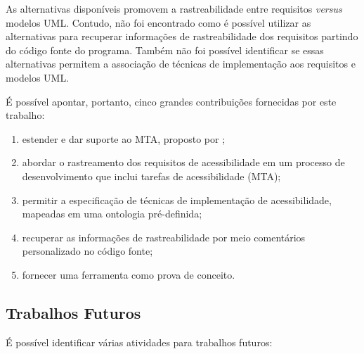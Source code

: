 \documentclass[runningheads,a4paper]{llncs}
\begin{document}
As alternativas disponíveis promovem a rastreabilidade entre requisitos \textit{versus} modelos UML. Contudo, não foi encontrado como é possível utilizar as alternativas para recuperar informações de rastreabilidade dos requisitos partindo do código fonte do programa. Também não foi possível identificar se essas alternativas permitem a associação de técnicas de implementação aos requisitos e modelos UML.

É possível apontar, portanto, cinco grandes contribuições fornecidas por este
trabalho:

\begin{enumerate}
  \item estender e dar suporte ao MTA, proposto por \cite{maia:10};
  \item abordar o rastreamento dos requisitos de acessibilidade em um processo
  de desenvolvimento que inclui tarefas de acessibilidade (MTA);
  \item permitir a especificação de técnicas de implementação de acessibilidade, 
  mapeadas em uma ontologia pré-definida;
  \item recuperar as informações de rastreabilidade por meio comentários
  personalizado no código fonte;
  \item fornecer uma ferramenta como prova de conceito.
\end{enumerate}

\subsection{Trabalhos Futuros}

É possível identificar várias atividades para trabalhos futuros:
\end{document}
